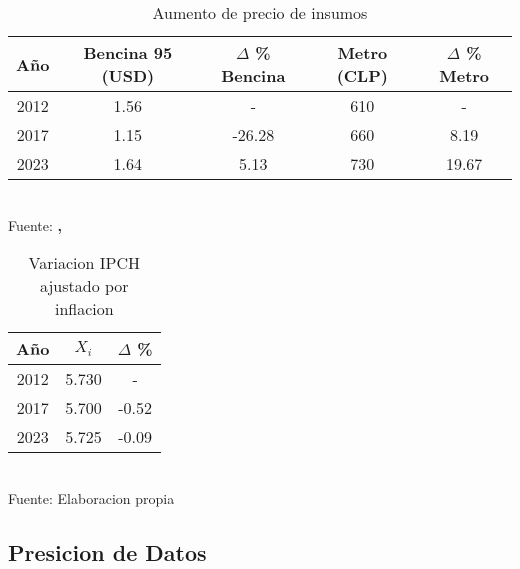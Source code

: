 \documentclass[12pt]{article} %
\begin{document}
\begin{table}[H]
    \centering
    \caption{Aumento de precio de insumos}
    \vspace{0.2cm}
    \begin{tabular}{|c|c|c|c|c|}
        \hline
        Año &  Bencina 95 (USD) & $\Delta$ \% Bencina & Metro (CLP) & $\Delta$ \% Metro\\
        \hline
        2012 &  1.56  & - & 610 & - \\
        2017 &  1.15 & -26.28 & 660 & 8.19\\
        2023 &  1.64 & 5.13 & 730 & 19.67\\
        \hline
    \end{tabular}
    \label{Insumos}
    \vspace{0.2cm}
    \\Fuente: \textbf{\cite{tradingeconomics}, \cite{bcentral}}
\end{table}

\begin{table}[H]
    \centering
    \caption{Variacion IPCH ajustado por inflacion}
    \vspace{0.2cm}
    \begin{tabular}{|c|c|c|}
        \hline
        Año & $X_i$ & $\Delta$ \% \\
        \hline
        2012 & 5.730 & - \\
        2017 & 5.700 & -0.52 \\
        2023 & 5.725 & -0.09 \\
        \hline
    \end{tabular}
    \vspace{0.2cm}
    \label{VariacionIPCH}
    \\Fuente: Elaboracion propia
\end{table}

\subsection{Presicion de Datos}
\end{document}
